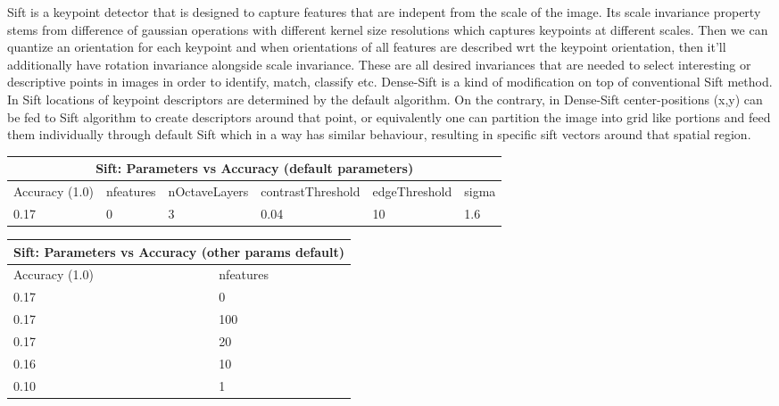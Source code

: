 \documentclass[12pt]{article}
\begin{document}
    \vspace*{0.5cm}
    \begin{center}
        \raggedright
        Sift is a keypoint detector that is designed to capture features that are indepent from the scale of the image.
        Its scale invariance property stems from difference of gaussian operations with different kernel size resolutions which captures keypoints at different scales.
        Then we can quantize an orientation for each keypoint and when orientations of all features are described wrt the keypoint orientation, then it'll additionally have rotation invariance alongside scale invariance.
        These are all desired invariances that are needed to select interesting or descriptive points in images in order to identify, match, classify etc.
        Dense-Sift is a kind of modification on top of conventional Sift method. In Sift locations of keypoint descriptors are determined by the default algorithm.
        On the contrary, in Dense-Sift center-positions (x,y) can be fed to Sift algorithm to create descriptors around that point, or equivalently one can partition the image into grid like portions 
        and feed them individually through default Sift which in a way has similar behaviour, resulting in specific sift vectors around that spatial region.
    \end{center}
    
    \vspace*{0.5cm}
        \begin{tabular}{ |p{1.5cm}||p{3cm}|p{3cm}|p{3cm}|p{3cm}|p{2cm}|  }
            \hline
            \multicolumn{6}{|c|}{Sift: Parameters vs Accuracy (default parameters)} \\
            \hline
            Accuracy (1.0) & nfeatures & nOctaveLayers & contrastThreshold & edgeThreshold & sigma \\
            \hline
            0.17 & 0 & 3 & 0.04 & 10 & 1.6 \\
            \hline
        \end{tabular}
    
        \vspace*{0.5cm}
    \begin{tabular}{ |p{1.5cm}||p{2cm}| }
        \hline
        \multicolumn{2}{|c|}{Sift: Parameters vs Accuracy (other params default)} \\
        \hline
        Accuracy (1.0) & nfeatures \\
        \hline
        0.17 & 0 \\
        \hline
        0.17 & 100 \\
        \hline
        0.17 & 20 \\
        \hline
        0.16 & 10 \\
        \hline
        0.10 & 1 \\
        \hline
    \end{tabular}
\end{document}
